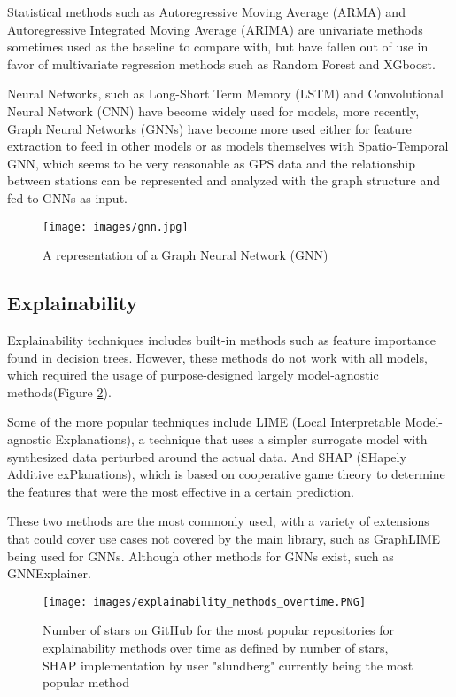 \documentclass{article}
\begin{document}
Statistical methods such as Autoregressive Moving Average (ARMA) and Autoregressive Integrated Moving Average (ARIMA)\cite{Kaltenbrunner2010} are univariate methods sometimes used as the baseline to compare with, but have fallen out of use in favor of multivariate regression methods such as Random Forest and XGboost\cite{Seo2021}\cite{Liang2022}.

Neural Networks, such as Long-Short Term Memory (LSTM) and Convolutional Neural Network (CNN) have become widely used for models\cite{Mehdi2022}, more recently, Graph Neural Networks (GNNs) have become more used either for feature extraction to feed in other models\cite{Liang2022} or as models themselves with Spatio-Temporal GNN\cite{guo2019}, which seems to be very reasonable as GPS data and the relationship between stations can be represented and analyzed with the graph structure and fed to GNNs as input.

\begin{figure}
\centering
\texttt{[image: images/gnn.jpg]}
\caption{A representation of a Graph Neural Network (GNN)}
\label{fig:GNN}
\end{figure}

\subsection{Explainability}

Explainability techniques includes built-in methods such as feature importance found in decision trees. However, these methods do not work with all models, which required the usage of purpose-designed largely model-agnostic methods(Figure \ref{fig:github}).

Some of the more popular techniques include LIME (Local Interpretable Model-agnostic Explanations)\cite{Ribeiro2016}, a technique that uses a simpler surrogate model with synthesized data perturbed around the actual data. And SHAP (SHapely Additive exPlanations)\cite{Lundberg2017}, which is based on cooperative game theory to determine the features that were the most effective in a certain prediction.

These two methods are the most commonly used, with a variety of extensions that could cover use cases not covered by the main library, such as GraphLIME being used for GNNs\cite{Holzinger2022}. Although other methods for GNNs exist, such as GNNExplainer\cite{Ying2019}.

\begin{figure}
\centering
\texttt{[image: images/explainability\_methods\_overtime.PNG]}
\caption{Number of stars on GitHub for the most popular repositories for explainability methods over time as defined by number of stars\cite{Holzinger2022}, SHAP implementation by user "slundberg" currently being the most popular method}
\label{fig:github}
\end{figure}
\end{document}

